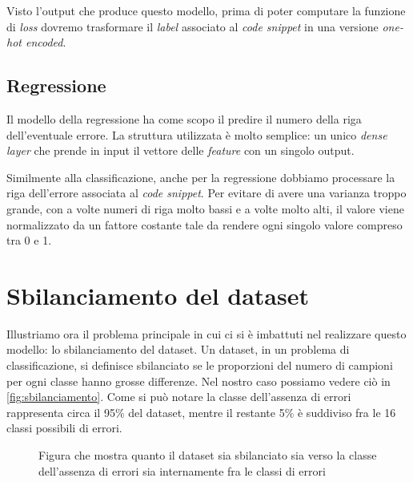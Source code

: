 Visto l'output che produce questo modello, prima di poter computare la funzione di \textit{loss} dovremo trasformare il \textit{label} associato al \textit{code snippet} in una versione \textit{one-hot encoded}. 




\subsection{Regressione}
Il modello della regressione ha come scopo il predire il numero della riga dell'eventuale errore.
La struttura utilizzata è molto semplice: un unico \textit{dense layer} che prende in input il vettore delle \textit{feature} con un singolo output.

Similmente alla classificazione, anche per la regressione dobbiamo processare la riga dell'errore associata al \textit{code snippet}. 
Per evitare di avere una varianza troppo grande, con a volte numeri di riga molto bassi e a volte molto alti, il valore viene normalizzato da un fattore costante tale da rendere ogni singolo valore compreso tra 0 e 1.



\section{Sbilanciamento del dataset}\label{sec:sbilanciamento}
Illustriamo ora il problema principale in cui ci si è imbattuti nel realizzare questo modello: lo sbilanciamento del dataset.
Un dataset, in un problema di classificazione, si definisce sbilanciato se le proporzioni del numero di campioni per ogni classe hanno grosse differenze.
Nel nostro caso possiamo vedere ciò in \autoref{fig:sbilanciamento}. 
Come si può notare la classe dell'assenza di errori rappresenta circa il 95\% del dataset, mentre il restante 5\% è suddiviso fra le 16 classi possibili di errori.


\begin{figure}[h]
    \centering

    \caption{Figura che mostra quanto il dataset sia sbilanciato sia verso la classe dell'assenza di errori sia internamente fra le classi di errori}
    \label{fig:sbilanciamento}
\end{figure}

